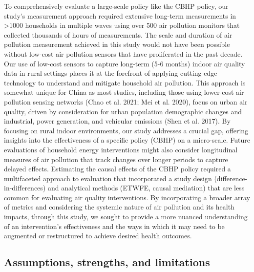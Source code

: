 \documentclass[
  letterpaper,
  DIV=11,
  numbers=noendperiod]{scrartcl}
\begin{document}
To comprehensively evaluate a large-scale policy like the CBHP policy,
our study's measurement approach required extensive long-term
measurements in \textgreater1000 households in multiple waves using over
500 air pollution monitors that collected thousands of hours of
measurements. The scale and duration of air pollution measurement
achieved in this study would not have been possible without low-cost air
pollution sensors that have proliferated in the past decade. Our use of
low-cost sensors to capture long-term (5-6 months) indoor air quality
data in rural settings places it at the forefront of applying
cutting-edge technology to understand and mitigate household air
pollution. This approach is somewhat unique for China as most studies,
including those using lower-cost air pollution sensing networks (Chao et
al. 2021; Mei et al. 2020), focus on urban air quality, driven by
consideration for urban population demographic changes and industrial,
power generation, and vehicular emissions (Shen et al. 2017). By
focusing on rural indoor environments, our study addresses a crucial
gap, offering insights into the effectiveness of a specific policy
(CBHP) on a micro-scale. Future evaluations of household energy
interventions might also consider longitudinal measures of air pollution
that track changes over longer periods to capture delayed effects.
Estimating the causal effects of the CBHP policy required a multifaceted
approach to evaluation that incorporated a study design
(difference-in-differences) and analytical methods (ETWFE, causal
mediation) that are less common for evaluating air quality
interventions. By incorporating a broader array of metrics and
considering the systemic nature of air pollution and its health impacts,
through this study, we sought to provide a more nuanced understanding of
an intervention's effectiveness and the ways in which it may need to be
augmented or restructured to achieve desired health outcomes.

\subsection{Assumptions, strengths, and
limitations}\label{assumptions-strengths-and-limitations}
\end{document}
